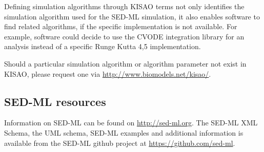 Defining simulation algorithms through KISAO terms not only identifies the simulation algorithm used for the SED-ML simulation, it also enables software to find related algorithms, if the specific implementation is not available. For example, software could decide to use the CVODE integration library for an analysis instead of a specific Runge Kutta 4,5 implementation. 

Should a particular simulation algorithm or algorithm parameter not exist in KISAO, please 
request one via \url{http://www.biomodels.net/kisao/}.

\subsection{SED-ML resources}
\label{sec:resources}

Information on SED-ML can be found on \url{http://sed-ml.org}. The SED-ML XML Schema, the UML schema, SED-ML examples and additional information is available from the SED-ML github project at \url{https://github.com/sed-ml}.
